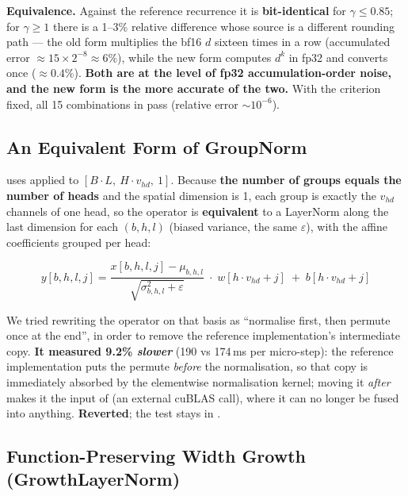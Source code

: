 \textbf{Equivalence.} Against the reference recurrence it is \textbf{bit-identical} for
$\gamma \le 0.85$; for $\gamma \ge 1$ there is a 1--3\% relative difference whose source
is a different rounding path --- the old form multiplies the bf16 $d$ sixteen times in a
row (accumulated error $\approx 15 \times 2^{-8} \approx 6\%$), while the new form computes
$d^k$ in fp32 and converts once ($\approx 0.4\%$). \textbf{Both are at the level of fp32
accumulation-order noise, and the new form is the more accurate of the two.} With the
criterion fixed, all 15 combinations in  pass
(relative error $\sim 10^{-6}$).

\subsection{An Equivalent Form of GroupNorm}
\label{sec:en-arch-gn}

 uses 
applied to $[B{\cdot}L,\ H{\cdot}v_{hd},\ 1]$. Because \textbf{the number of groups equals
the number of heads} and the spatial dimension is 1, each group is exactly the $v_{hd}$
channels of one head, so the operator is \textbf{equivalent} to a LayerNorm along the last
dimension for each $(b,h,l)$ (biased variance, the same $\varepsilon$), with the affine
coefficients grouped per head:

\[
y[b,h,l,j] = \frac{x[b,h,l,j]-\mu_{b,h,l}}{\sqrt{\sigma^2_{b,h,l}+\varepsilon}}
\;\cdot\; w[h{\cdot}v_{hd}+j] \;+\; b[h{\cdot}v_{hd}+j]
\]

We tried rewriting the operator on that basis as ``normalise first, then permute once at
the end'', in order to remove the reference implementation's intermediate copy.
\textbf{It measured 9.2\% \emph{slower}} (190 vs 174\,ms per micro-step): the reference
implementation puts the permute \emph{before} the normalisation, so that copy is
immediately absorbed by the elementwise normalisation kernel; moving it \emph{after}
makes it the input of  (an external cuBLAS call), where it can no longer
be fused into anything. \textbf{Reverted}; the test stays in
.

\subsection{Function-Preserving Width Growth (GrowthLayerNorm)}
\label{sec:en-arch-growth}

